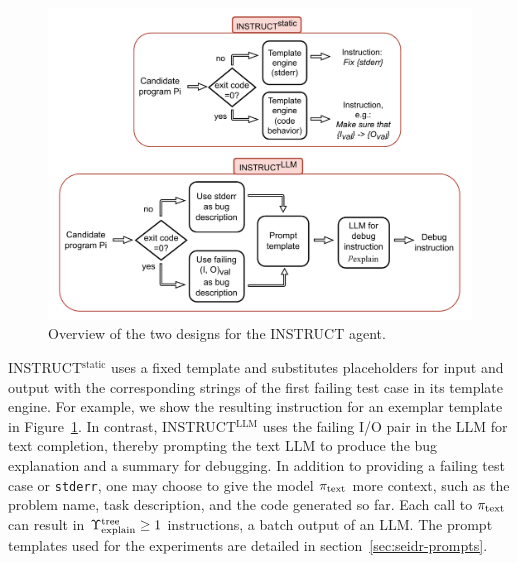 \begin{figure}
    \centering
    \includegraphics[width=\linewidth,trim={0mm 0mm 0mm 0mm}]{images/codex-for-psb-seidr-instruct-2.drawio.pdf}
    \caption{Overview of the two designs for the INSTRUCT agent.}
    \label{fig:method-instruct}
\end{figure}

INSTRUCT$^{\text{static}}$ uses a fixed template and substitutes placeholders for input and output with the corresponding strings of the first failing test case in its template engine.
For example, we show the resulting instruction for an exemplar template in Figure~\ref{fig:method-instruct}.
In contrast, INSTRUCT$^{\text{LLM}}$ uses the failing I/O pair in the LLM for text completion, thereby prompting the text LLM to produce the bug explanation and a summary for debugging. 
In addition to providing a failing test case or \texttt{stderr}, one may choose to give the model $ \pi_\text{text} $ more context, such as the problem name, task description, and the code generated so far. 
Each call to $ \pi_\text{text} $ can result in $\Upsilon^\text{tree}_\text{explain}\ge1$ instructions, a batch output of an LLM.
The prompt templates used for the experiments are detailed in section~\ref{sec:seidr-prompts}.


